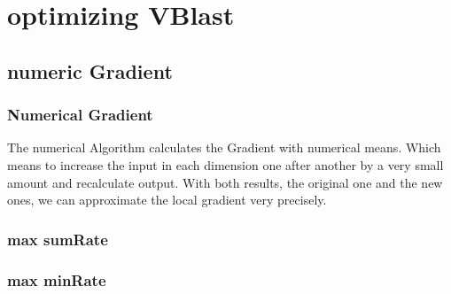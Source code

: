 \section{optimizing VBlast}

\subsection{numeric Gradient}

\subsubsection{Numerical Gradient}
The numerical Algorithm calculates the Gradient with numerical means. Which means to increase the input in each dimension one after another by a very small amount and recalculate output. With both results, the original one and the new ones, we can approximate the local gradient very precisely.
\begin{algorithm}
\end{algorithm}
\subsubsection{max sumRate}
\subsubsection{max minRate}

